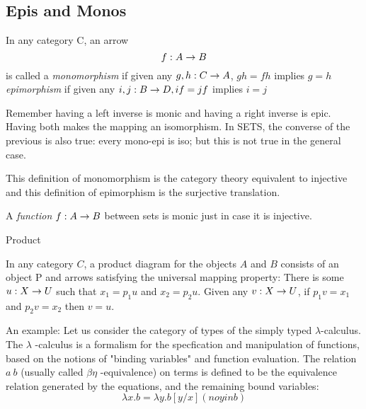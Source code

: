 \documentclass[../../notes.tex]{subfiles}
\begin{document}
\subsection{Epis and Monos}

\begin{definition}

  In any category C, an arrow $$ f : A \rightarrow B $$ is
  called a \textit{monomorphism} if given any $ g, h : C \rightarrow A$,
  $gh = fh$ implies $g = h$ \\

  \textit{epimorphism} if given any $i,j : B \rightarrow D, if = jf$ implies $i = j$


\end{definition}

Remember having a left inverse is monic and having a right inverse is epic. Having both makes the mapping an isomorphism. In SETS, the converse of the previous is also true: every mono-epi is iso; but this is not true in the general case.

This definition of monomorphism is the category theory equivalent to injective and this definition of epimorphism is the surjective translation.


\begin{proposition}

  A \textit{function} $ f : A \rightarrow B$ between sets is monic just in case it is injective. 
  
\end{proposition}

%

\begin{definition}{Product}

  In any category $C$, a product diagram for the objects $A$ and $B$
  consists of an object P and arrows
satisfying the universal mapping property: There is some $u: X \rightarrow U$
such that $x_1 = p_1u$ and $x_2 = p_{2}u$. Given any $v: X \rightarrow U$, if
$p_{1}v = x_1$ and $p_{2}v = x_2$ then $v = u$.
\end{definition}

An example:
Let us consider the category of types of the simply typed $\lambda$-calculus.
The $\lambda$ -calculus is a formalism for the specfication and manipulation of functions, based
on the notions of "binding variables" and function evaluation. The relation $ a ~ b $
(usually called $\beta\eta$ -equivalence) on terms is defined to be the equivalence relation
generated by the equations, and the remaining bound variables:
$$ \lambda x.b = \lambda y.b [y/x] (no y in b) $$
\end{document}
